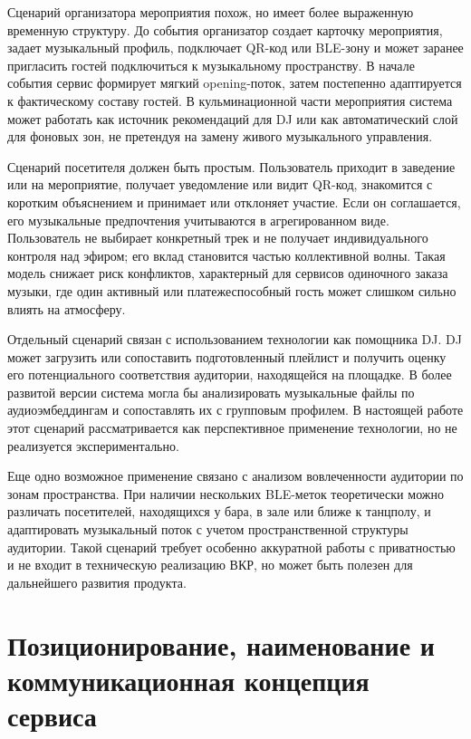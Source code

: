Сценарий организатора мероприятия похож, но имеет более выраженную временную структуру. До события организатор создает карточку мероприятия, задает музыкальный профиль, подключает QR-код или BLE-зону и может заранее пригласить гостей подключиться к музыкальному пространству. В начале события сервис формирует мягкий opening-поток, затем постепенно адаптируется к фактическому составу гостей. В кульминационной части мероприятия система может работать как источник рекомендаций для DJ или как автоматический слой для фоновых зон, не претендуя на замену живого музыкального управления.

Сценарий посетителя должен быть простым. Пользователь приходит в заведение или на мероприятие, получает уведомление или видит QR-код, знакомится с коротким объяснением и принимает или отклоняет участие. Если он соглашается, его музыкальные предпочтения учитываются в агрегированном виде. Пользователь не выбирает конкретный трек и не получает индивидуального контроля над эфиром; его вклад становится частью коллективной волны. Такая модель снижает риск конфликтов, характерный для сервисов одиночного заказа музыки, где один активный или платежеспособный гость может слишком сильно влиять на атмосферу.

Отдельный сценарий связан с использованием технологии как помощника DJ. DJ может загрузить или сопоставить подготовленный плейлист и получить оценку его потенциального соответствия аудитории, находящейся на площадке. В более развитой версии система могла бы анализировать музыкальные файлы по аудиоэмбеддингам и сопоставлять их с групповым профилем. В настоящей работе этот сценарий рассматривается как перспективное применение технологии, но не реализуется экспериментально.

Еще одно возможное применение связано с анализом вовлеченности аудитории по зонам пространства. При наличии нескольких BLE-меток теоретически можно различать посетителей, находящихся у бара, в зале или ближе к танцполу, и адаптировать музыкальный поток с учетом пространственной структуры аудитории. Такой сценарий требует особенно аккуратной работы с приватностью и не входит в техническую реализацию ВКР, но может быть полезен для дальнейшего развития продукта.

\section{Позиционирование, наименование и коммуникационная концепция сервиса}
\label{sec:service:positioning}

